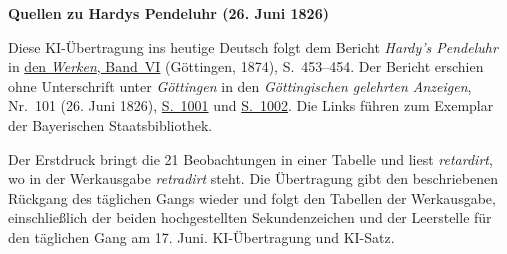 \clearpage\thispagestyle{empty}
\begin{center}\textbf{Quellen zu Hardys Pendeluhr (26. Juni 1826)}\end{center}
\noindent Diese KI-Übertragung ins heutige Deutsch folgt dem Bericht \textit{Hardy’s Pendeluhr} in \href{https://gdz.sub.uni-goettingen.de/id/PPN236007467}{den \textit{Werken}, Band~VI} (Göttingen, 1874), S.~453--454. Der Bericht erschien ohne Unterschrift unter \textit{Göttingen} in den \textit{Göttingischen gelehrten Anzeigen}, Nr.~101 (26. Juni 1826), \href{https://api.digitale-sammlungen.de/iiif/image/v2/bsb10538704_00329/full/1550,/0/default.jpg}{S.~1001} und \href{https://api.digitale-sammlungen.de/iiif/image/v2/bsb10538704_00330/full/1550,/0/default.jpg}{S.~1002}. Die Links führen zum Exemplar der Bayerischen Staatsbibliothek.
\par\smallskip\noindent Der Erstdruck bringt die 21 Beobachtungen in einer Tabelle und liest \textit{retardirt}, wo in der Werkausgabe \textit{retradirt} steht. Die Übertragung gibt den beschriebenen Rückgang des täglichen Gangs wieder und folgt den Tabellen der Werkausgabe, einschließlich der beiden hochgestellten Sekundenzeichen und der Leerstelle für den täglichen Gang am 17. Juni. KI-Übertragung und KI-Satz.
\clearpage
